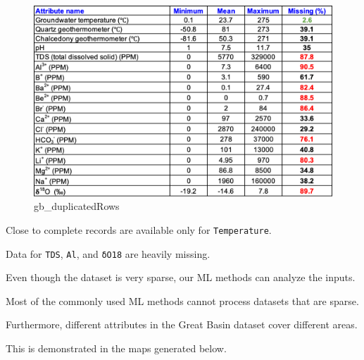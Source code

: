 \documentclass[11pt]{article}
\begin{document}
\begin{figure}
\centering
\includegraphics{../data/gb_duplicatedRows.png}
\caption{gb\_duplicatedRows}
\end{figure}

Close to complete records are available only for \texttt{Temperature}.

Data for \texttt{TDS}, \texttt{Al}, and \texttt{δO18} are heavily
missing.

Even though the dataset is very sparse, our ML methods can analyze the
inputs.

Most of the commonly used ML methods cannot process datasets that are
sparse.

Furthermore, different attributes in the Great Basin dataset cover
different areas.

This is demonstrated in the maps generated below.
\end{document}
